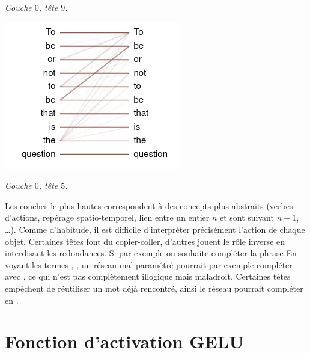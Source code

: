 \documentclass[11pt,class=report,crop=false]{standalone}
\begin{document}
\begin{center}
\begin{minipage}{0.3\textwidth}
	\emph{Couche $0$, tête $9$.}
    \end{minipage}
    \quad
	\begin{minipage}{0.3\textwidth}
	\center
	\includegraphics[scale=\myscale,scale=0.5]{figures/attention_l0_h5}
	
	\emph{Couche $0$, tête $5$.}
   \end{minipage}

\end{center}


Les couches le plus hautes correspondent à des concepts plus abstraits (verbes d'actions, repérage spatio-temporel, lien entre un entier $n$ et sont suivant $n+1$, \ldots). Comme d'habitude, il est difficile d'interpréter précisément l'action de chaque objet. 
Certaines têtes font du copier-coller, d'autres jouent le rôle inverse en interdisant les redondances. Si par exemple on souhaite compléter la phrase \og{}\fg{} En voyant les termes , ,  un réseau mal paramétré pourrait par exemple compléter avec , ce qui n'est pas complètement illogique mais maladroit. Certaines têtes empêchent de réutiliser un mot déjà rencontré, ainsi le réseau pourrait compléter en .



\section{Fonction d'activation GELU}


\end{document}
